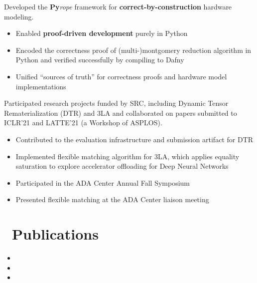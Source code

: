 \documentclass{resume}
\begin{document}
Developed the \textbf{Py}\textit{rope} framework for \textbf{correct-by-construction} hardware modeling.
\begin{itemize}
  \item Enabled \textbf{proof-driven development} purely in Python
  \item Encoded the correctness proof of (multi-)montgomery reduction algorithm in Python and verified successfully by compiling to Dafny
  \item Unified ``sources of truth'' for correctness proofs and hardware model implementations
\end{itemize}

Participated research projects funded by SRC, including Dynamic Tensor Rematerialization (DTR) and 3LA and collaborated on papers submitted to ICLR'21 and LATTE'21 (a Workshop of ASPLOS). 
\begin{itemize}
    \item Contributed to the evaluation infrastructure and submission artifact for DTR
    \item Implemented flexible matching algorithm for 3LA, which applies equality saturation to explore accelerator offloading for Deep Neural Networks
    \item Participated in the ADA Center Annual Fall Symposium
    \item Presented flexible matching at the ADA Center liaison meeting
\end{itemize}

\section{\faLeanpub\ Publications}
\begin{itemize}
    \item {}
    \item {}
    \item {}
\end{itemize}
\end{document}
